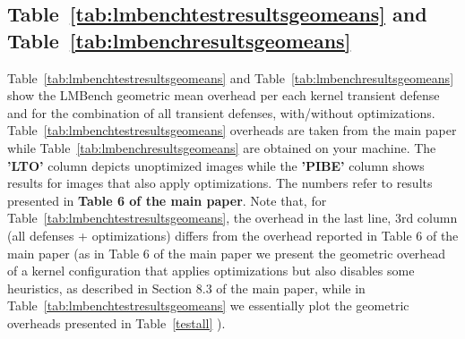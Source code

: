 \documentclass{article}
\begin{document}
\subsection{Table~\ref{tab:lmbenchtestresultsgeomeans} and Table~\ref{tab:lmbenchresultsgeomeans}}
Table~\ref{tab:lmbenchtestresultsgeomeans} and Table~\ref{tab:lmbenchresultsgeomeans} show the LMBench 
geometric mean overhead per each kernel transient defense and for the combination of all transient defenses,
with/without optimizations. 
Table~\ref{tab:lmbenchtestresultsgeomeans} overheads are taken from the main paper while Table~\ref{tab:lmbenchresultsgeomeans}
are obtained on your machine. 
The \textbf{'LTO'} column depicts unoptimized images while the \textbf{'PIBE'}
column shows results for images that also apply optimizations.
The numbers refer to results presented in \textbf{Table 6 of the main paper}.
Note that, for Table~\ref{tab:lmbenchtestresultsgeomeans}, the overhead in the last line, 3rd column (all defenses + optimizations) differs from the overhead reported
 in Table 6 of the main paper (as in Table 6 of the main paper we present the geometric 
overhead of a kernel configuration that applies optimizations but also disables some heuristics, as described in 
Section 8.3 of the main paper, while in Table~\ref{tab:lmbenchtestresultsgeomeans} we essentially plot the geometric
overheads presented in Table~\ref{testall} ).

\begin{table}[H]
\begin{center}

\end{center}
\label{tab:lmbenchtestresultsgeomeans} 
\end{table}

\begin{table}[H]
\begin{center}

\end{center}
\label{tab:lmbenchresultsgeomeans} 
\end{table}
\end{document}
